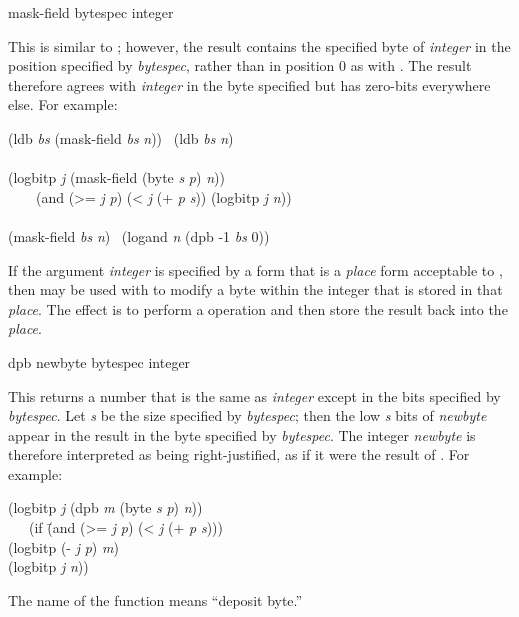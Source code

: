 \begin{defun}[Function]
mask-field bytespec integer

This is similar to ; however, the result contains
the specified byte
of \emph{integer} in the position specified by \emph{bytespec},
rather than in position 0 as with .
The result therefore agrees with \emph{integer} in the byte specified
but has zero-bits everywhere else.
For example:
\begin{lisp}
(ldb \emph{bs} (mask-field \emph{bs} \emph{n})) \EQ\ (ldb \emph{bs} \emph{n}) \\
 \\
(logbitp \emph{j} (mask-field (byte \emph{s} \emph{p}) \emph{n})) \\
~~~\EQ\ (and (>= \emph{j} \emph{p}) (< \emph{j} (+ \emph{p} \emph{s})) (logbitp \emph{j} \emph{n})) \\
 \\
(mask-field \emph{bs} \emph{n}) \EQ\ (logand \emph{n} (dpb -1 \emph{bs} 0))
\end{lisp}

If the argument \emph{integer} is specified by a form that is a \emph{place} form
acceptable to ,
then  may be used with 
to modify a byte within the integer that is stored
in that \emph{place}.
The effect is to perform a  operation
and then store the result back into the \emph{place}.
\end{defun}

\begin{defun}[Function]
dpb newbyte bytespec integer

This returns a number that is the same as \emph{integer} except in the
bits specified by \emph{bytespec}.  Let \emph{s} be the size specified
by \emph{bytespec}; then the low \emph{s} bits of \emph{newbyte} appear in
the result in the byte specified by \emph{bytespec}.
The integer \emph{newbyte} is therefore interpreted as
being right-justified, as if it were the result of .
For example:
\begin{lisp}
(logbitp \emph{j} (dpb \emph{m} (byte \emph{s} \emph{p}) \emph{n})) \\
~~\EQ\ (if \=(and (>= \emph{j} \emph{p}) (< \emph{j} (+ \emph{p} \emph{s}))) \\
\>(logbitp (- \emph{j} \emph{p}) \emph{m}) \\
\>(logbitp \emph{j} \emph{n}))
\end{lisp}
The name of the function  means ``deposit byte.''
\end{defun}

